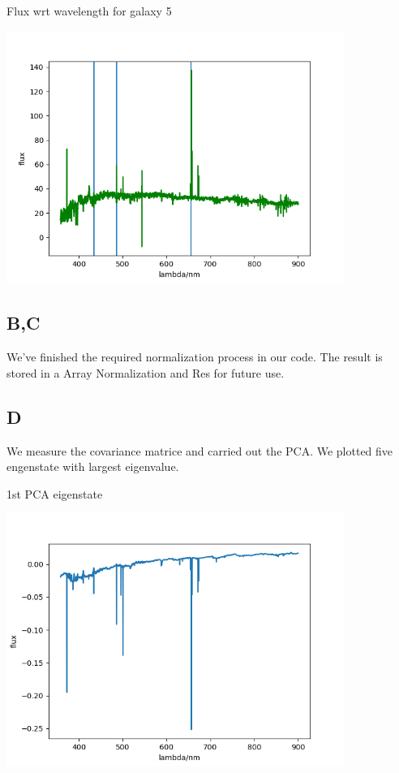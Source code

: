 \documentclass[letterpaper,12pt]{article}
\begin{document}
\begin{table}[!h]
    \centering
    \caption{Flux wrt wavelength for galaxy 5}
    \includegraphics[width=11cm]{7-1-4.png}
\end{table}%
\newpage

\subsection{B,C}

We've finished the required normalization process in our code. The result is stored in a Array Normalization and Res for future use.

\subsection{D}

We measure the covariance matrice and carried out the PCA. We plotted five engenstate with largest eigenvalue.

\begin{table}[!h]
    \centering
    \caption{1st PCA eigenstate}
    \includegraphics[width=11cm]{7-4-0.png}
\end{table}%
\end{document}
